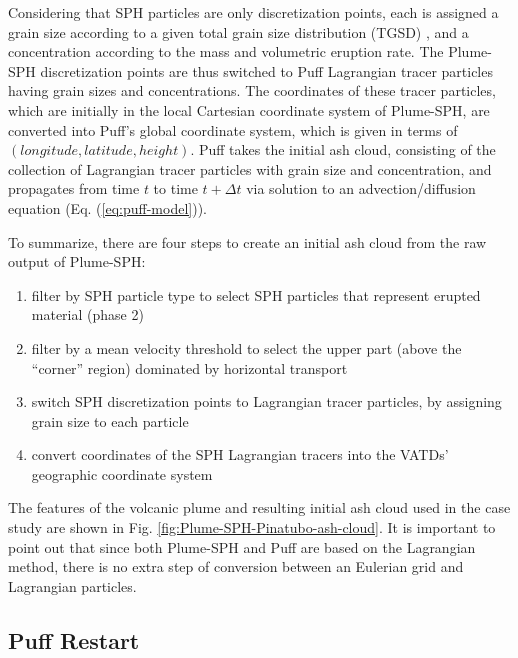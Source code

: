\documentclass[utf8]{frontiersSCNS} %
\begin{document}
Considering that SPH particles are only discretization points, each is assigned a grain size according to a given total grain size distribution (TGSD) \citep{paladio1996tephra}, and a concentration according to the mass and volumetric eruption rate. The Plume-SPH discretization points are thus switched to Puff Lagrangian tracer particles having grain sizes and concentrations. The coordinates of these tracer particles, which are initially in the local Cartesian coordinate system of Plume-SPH, are converted into Puff's global coordinate system, which is given in terms of $(longitude, latitude, height)$. Puff takes the initial ash cloud, consisting of the collection of Lagrangian tracer particles with grain size and concentration, and propagates from time $t$ to time $t+\Delta t$ via solution to an advection/diffusion equation (Eq. (\ref{eq:puff-model})).

To summarize, there are four steps to create an initial ash cloud from the raw output of Plume-SPH:
\begin{enumerate}
\item filter by SPH particle type to select SPH particles that represent erupted material (phase 2)
\item filter by a mean velocity threshold to select the upper part (above the ``corner'' region) dominated by horizontal transport
\item switch SPH discretization points to Lagrangian tracer particles, by assigning grain size to each particle
\item convert coordinates of the SPH Lagrangian tracers into the VATDs' geographic coordinate system
\end{enumerate}
The features of the volcanic plume and resulting initial ash cloud used in the case study are shown in Fig. \ref{fig:Plume-SPH-Pinatubo-ash-cloud}. It is important to point out that since both Plume-SPH and Puff are based on the Lagrangian method, there is no extra step of conversion between an Eulerian grid and Lagrangian particles.

\subsection{Puff Restart}
\end{document}
